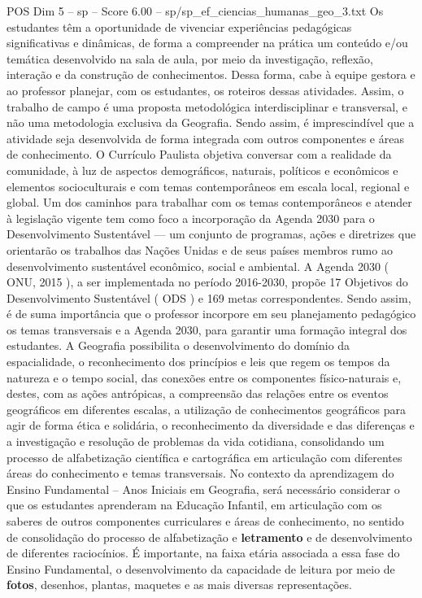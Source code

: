 \begin{textsample}{POS Dim 5 – sp – Score 6.00 – sp/sp\_ef\_ciencias\_humanas\_geo\_3.txt}
Os estudantes têm a oportunidade de vivenciar experiências pedagógicas significativas e dinâmicas, de forma a compreender na prática um conteúdo e/ou temática desenvolvido na sala de aula, por meio da investigação, reflexão, interação e da construção de conhecimentos.
Dessa forma, cabe à equipe gestora e ao professor planejar, com os estudantes, os roteiros dessas atividades.
Assim, o trabalho de campo é uma proposta metodológica interdisciplinar e transversal, e não uma metodologia exclusiva da Geografia.
Sendo assim, é imprescindível que a atividade seja desenvolvida de forma integrada com outros componentes e áreas de conhecimento.
O Currículo Paulista objetiva conversar com a realidade da comunidade, à luz de aspectos demográficos, naturais, políticos e econômicos e elementos socioculturais e com temas contemporâneos em escala local, regional e global.
Um dos caminhos para trabalhar com os temas contemporâneos e atender à legislação vigente tem como foco a incorporação da Agenda 2030 para o Desenvolvimento Sustentável — um conjunto de programas, ações e diretrizes que orientarão os trabalhos das Nações Unidas e de seus países membros rumo ao desenvolvimento sustentável econômico, social e ambiental.
A Agenda 2030 ( ONU, 2015 ), a ser implementada no período 2016-2030, propõe 17 Objetivos do Desenvolvimento Sustentável ( ODS ) e 169 metas correspondentes.
Sendo assim, é de suma importância que o professor incorpore em seu planejamento pedagógico os temas transversais e a Agenda 2030, para garantir uma formação integral dos estudantes.
A Geografia possibilita o desenvolvimento do domínio da espacialidade, o reconhecimento dos princípios e leis que regem os tempos da natureza e o tempo social, das conexões entre os componentes físico-naturais e, destes, com as ações antrópicas, a compreensão das relações entre os eventos geográficos em diferentes escalas, a utilização de conhecimentos geográficos para agir de forma ética e solidária, o reconhecimento da diversidade e das diferenças e a investigação e resolução de problemas da vida cotidiana, consolidando um processo de alfabetização científica e cartográfica em articulação com diferentes áreas do conhecimento e temas transversais.
No contexto da aprendizagem do Ensino Fundamental – Anos Iniciais em Geografia, será necessário considerar o que os estudantes aprenderam na Educação Infantil, em articulação com os saberes de outros componentes curriculares e áreas de conhecimento, no sentido de consolidação do processo de alfabetização e \textbf{letramento} e de desenvolvimento de diferentes raciocínios.
É importante, na faixa etária associada a essa fase do Ensino Fundamental, o desenvolvimento da capacidade de leitura por meio de \textbf{fotos}, desenhos, plantas, maquetes e as mais diversas representações.

\end{textsample}
